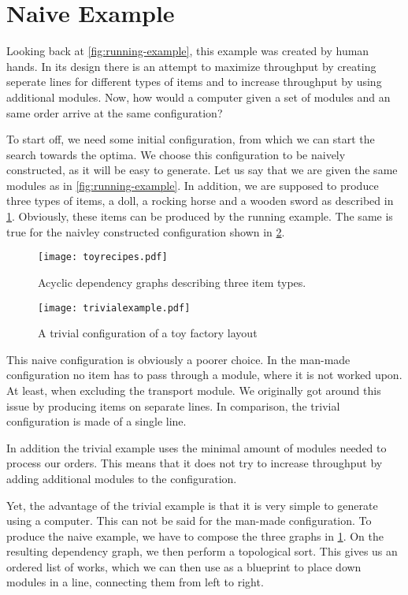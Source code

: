 \section{Naive Example}
Looking back at \cref{fig:running-example}, this example was created by human hands. In its design there is an attempt to maximize throughput by creating seperate lines for different types of items and to increase throughput by using additional modules. Now, how would a computer given a set of modules and an same order arrive at the same configuration?

To start off, we need some initial configuration, from which we can start the search towards the optima. We choose this configuration to be naively constructed, as it will be easy to generate. Let us say that we are given the same modules as in \cref{fig:running-example}. In addition, we are supposed to produce three types of items, a doll, a rocking horse and a wooden sword as described in \cref{fig:toy-recipes}. Obviously, these items can be produced by the running example. The same is true for the naivley constructed configuration shown in \cref{fig:trivial-example}.  

\begin{figure}[H]
\centering
\texttt{[image: toyrecipes.pdf]}
\caption{Acyclic dependency graphs describing three item types.}
\label{fig:toy-recipes}
\end{figure}

\begin{figure}[H]
\centering
\texttt{[image: trivialexample.pdf]}
\caption{A trivial configuration of a toy factory layout}
\label{fig:trivial-example}
\end{figure}


This naive configuration is obviously a poorer choice. In the man-made configuration no item has to pass through a module, where it is not worked upon. At least, when excluding the transport module. We originally got around this issue by producing items on separate lines. In comparison, the trivial configuration is made of a single line.

In addition the trivial example uses the minimal amount of modules needed to process our orders. This means that it does not try to increase throughput by adding additional modules to the configuration. 

Yet, the advantage of the trivial example is that it is very simple to generate using a computer. This can not be said for the man-made configuration. To produce the naive example, we have to compose the three graphs in \cref{fig:toy-recipes}. On the resulting dependency graph, we then perform a topological sort. This gives us an ordered list of works, which we can then use as a blueprint to place down modules in a line, connecting them from left to right.

